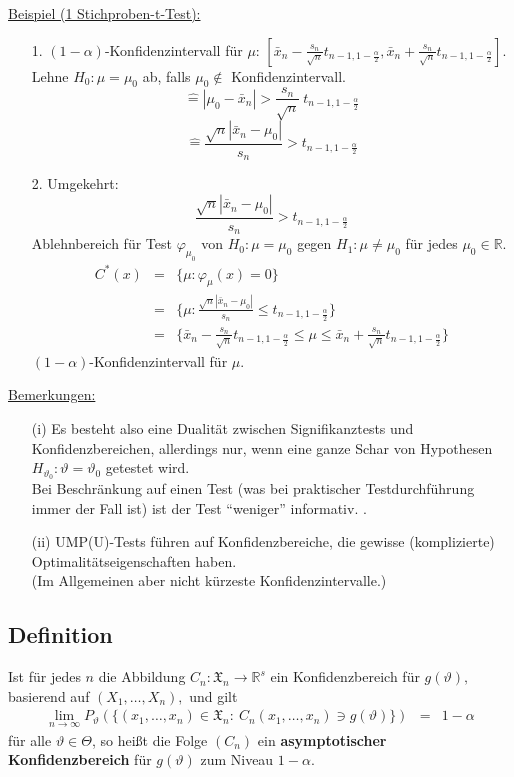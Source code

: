 \documentclass[a4paper,11pt,twoside,titlepage]{article}
\newcommand{\R}{{\mathbb R}}
\newcommand{\XX}{{\mathfrak X}} %
\begin{document}
\underline{Beispiel (1 Stichproben-t-Test):}
\begin{itemize}
\item[1. ]$(1-\alpha)$-Konfidenzintervall für $\mu$: $[\bar{x}_n-\frac{s_n}{\sqrt{n}}t_{n-1,1-\frac{\alpha}{2}},\bar{x}_n+\frac{s_n}{\sqrt{n}}t_{n-1,1-\frac{\alpha}{2}}]$.\\
Lehne $H_0:\mu=\mu_0$ ab, falls $\mu_0\notin$ Konfidenzintervall.
$$\hat{=}|\mu_0-\bar{x}_n| >\frac{s_n}{\sqrt{n}}\ t_{n-1,1-\frac{\alpha}{2}}$$
$$\hat{=}\frac{\sqrt{n} | \bar{x}_n-\mu_0|}{s_n}>t_{n-1,1-\frac{\alpha}{2}}$$
\item[2. ]Umgekehrt:
$$\frac{\sqrt{n} | \bar{x}_n-\mu_0|}{s_n}>t_{n-1,1-\frac{\alpha}{2}}$$ Ablehnbereich für
Test $\varphi_{\mu_0}$ von $H_0:\mu=\mu_0$ gegen $H_1:\mu\neq\mu_0$ für jedes $\mu_0\in\R$.
\begin{eqnarray*}
C^\ast(x)&=&\{\mu:\varphi_\mu(x)=0\}\\
&=&\{\mu:\frac{\sqrt{n} | \bar{x}_n-\mu_0|}{s_n}\leq t_{n-1,1-\frac{\alpha}{2}}\}\\
&=&\{\bar{x}_n-\frac{s_n}{\sqrt{n}}t_{n-1,1-\frac{\alpha}{2}}\leq\mu\leq\bar{x}_n+\frac{s_n}{\sqrt{n}}t_{n-1,1-\frac{\alpha}{2}}\}
\end{eqnarray*}
$(1-\alpha)$-Konfidenzintervall für $\mu$.
\end{itemize}
\underline{Bemerkungen:}
\begin{itemize}
\item[(i) ]Es besteht also eine Dualität zwischen Signifikanztests und Konfidenzbereichen, allerdings nur,
wenn eine ganze Schar von Hypothesen\\ $H_{\vartheta_0}:\vartheta=\vartheta_0$ getestet wird.\\
Bei Beschränkung auf einen Test (was bei praktischer Testdurchführung immer der Fall ist) ist der Test "`weniger"' informativ. .
\item[(ii) ]UMP(U)-Tests führen auf Konfidenzbereiche, die gewisse (komplizierte) Optimalitätseigenschaften
haben.\\ (Im Allgemeinen aber nicht kürzeste Konfidenzintervalle.)
\end{itemize}

\subsection{Definition} %
Ist f\"ur jedes $n$ die Abbildung $C_n:\XX_n\rightarrow\R^s$ ein Konfidenzbereich
f\"ur $g(\vartheta),$ basierend auf $(X_1,\ldots,X_n),$ und gilt
\begin{eqnarray*}
 \lim_{n\rightarrow\infty} P_\vartheta\left(\{(x_1,\ldots,x_n)\in\XX_n:~
  C_n(x_1,\ldots,x_n)\ni g(\vartheta)\}\right) &=& 1-\alpha
\end{eqnarray*}
für alle $\vartheta\in\Theta$, so heißt die Folge $(C_n)$ ein
\textbf{asymptotischer Konfidenzbereich} für $g(\vartheta)$ zum Niveau $1-\alpha$.
\end{document}
